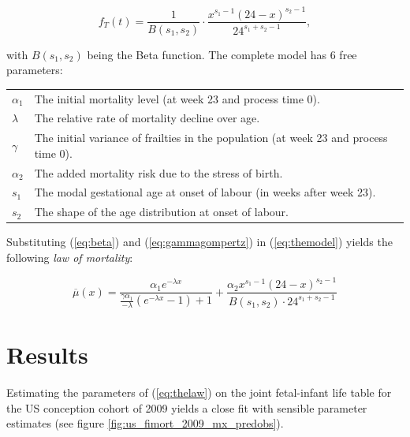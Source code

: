\documentclass[12pt, parskip=half]{scrartcl}
\begin{document}
\begin{equation}
  f_T(t) = \frac{1}{B(s_1,s_2)} \cdot \frac{x^{s_1-1} (24-x)^{s_2-1}} {24^{s_1+s_2-1}},
  \label{eq:beta}
\end{equation}

with $B(s_1,s_2)$ being the Beta function. The complete model has 6 free parameters:

\begin{tabular}{ll}
  $\alpha_1$ & The initial mortality level (at week 23 and process time 0). \\
  $\lambda$ & The relative rate of mortality decline over age. \\
  $\gamma$ & The initial variance of frailties in the population (at week 23 and process time 0).\\
  $\alpha_2$ & The added mortality risk due to the stress of birth. \\
  $s_1$ & The modal gestational age at onset of labour (in weeks after week 23). \\
  $s_2$ & The shape of the age distribution at onset of labour. \\
\end{tabular}

Substituting (\ref{eq:beta}) and (\ref{eq:gammagompertz}) in (\ref{eq:themodel}) yields the following \emph{law of mortality}:

\begin{equation}
  \overline{\mu}(x) =
  \frac {\alpha_1 e^{-\lambda x}} {\frac{\gamma \alpha_1} {-\lambda} (e^{-\lambda x} - 1) + 1} +
  \frac{\alpha_2 x^{s_1-1} (24-x)^{s_2-1}} {B(s_1,s_2) \cdot 24^{s_1+s_2-1}}
  \label{eq:thelaw}
\end{equation}

\section{Results} %
\label{sec:results}

Estimating the parameters of (\ref{eq:thelaw}) on the joint fetal-infant life table for the US conception cohort of 2009 yields a close fit with sensible parameter estimates (see figure \ref{fig:us_fimort_2009_mx_predobs}).
\end{document}
